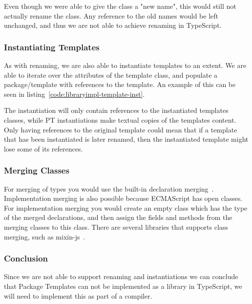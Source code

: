 
Even though we were able to give the class a "new name", this would still not actually rename the class.
Any reference to the old names would be left unchanged, and thus we are not able to achieve renaming in TypeScript.

\subsubsection{Instantiating Templates}\label{subsubsec:instantiating-templates}

As with renaming, we are also able to instantiate templates to an extent.
We are able to iterate over the attributes of the template class, and populate a package/template with references to the template.
An example of this can be seen in listing~\vref{code:libraryimpl-template-inst}.


The instantiation will only contain references to the instantiated templates classes, while PT instantiations make textual copies of the templates content.
Only having references to the original template could mean that if a template that has been instantiated is later renamed, then the instantiated template might lose some of its references.


\subsubsection{Merging Classes}

For merging of types you would use the built-in declaration merging~\cite{declerationmerging}.
Implementation merging is also possible because ECMAScript has open classes.
For implementation merging you would create an empty class which has the type of the merged declarations, and then assign the fields and methods from the merging classes to this class.
There are several libraries that supports class merging, such as mixin-js~\cite{mixinjs}.

\subsubsection{Conclusion}

Since we are not able to support renaming and instantiations we can conclude that Package Templates can not be implemented as a library in TypeScript, we will need to implement this as part of a compiler.
